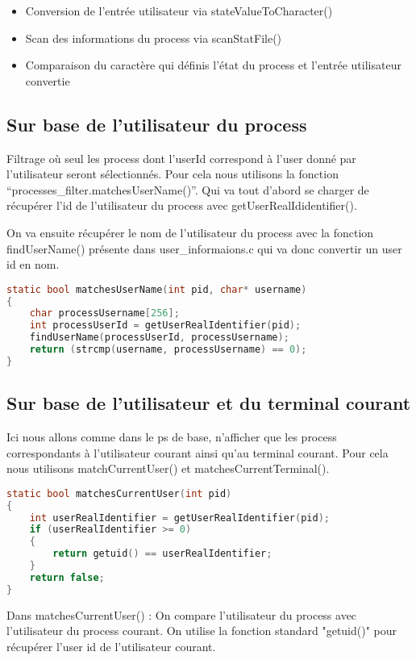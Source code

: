 \begin{itemize}
\item Conversion de l'entrée utilisateur via stateValueToCharacter()
\item Scan des informations du process via scanStatFile()
\item Comparaison du caractère qui définis l'état du process et l'entrée utilisateur convertie
\end{itemize}


\subsection{Sur base de l’utilisateur du process}
Filtrage où seul les process dont l’userId correspond à l’user donné par l’utilisateur seront sélectionnés. Pour cela nous utilisons la fonction “processes_filter.matchesUserName()”. Qui va tout d’abord se charger de récupérer l’id de l’utilisateur du process avec getUserRealIdidentifier().

On va ensuite récupérer le nom de l'utilisateur du process avec la fonction findUserName() présente dans user_informaions.c qui va donc convertir un user id en nom.


\begin{lstlisting}[frame=single, language=c]
static bool matchesUserName(int pid, char* username)
{
    char processUsername[256];
    int processUserId = getUserRealIdentifier(pid);
    findUserName(processUserId, processUsername);
    return (strcmp(username, processUsername) == 0);
}
\end{lstlisting}



\subsection{Sur base de l’utilisateur et du terminal courant} 
Ici nous allons comme dans le ps de base, n'afficher que les process correspondants à l'utilisateur courant ainsi qu'au terminal courant. Pour cela nous utilisons matchCurrentUser() et matchesCurrentTerminal().


\begin{lstlisting}[frame=single, language=c]
static bool matchesCurrentUser(int pid)
{
    int userRealIdentifier = getUserRealIdentifier(pid);
    if (userRealIdentifier >= 0)
    {
        return getuid() == userRealIdentifier;
    }
    return false;
}
\end{lstlisting}

Dans matchesCurrentUser() : On compare l'utilisateur du process avec l'utilisateur du process courant. On utilise la fonction standard "getuid()" pour récupérer l'user id de l'utilisateur courant.


